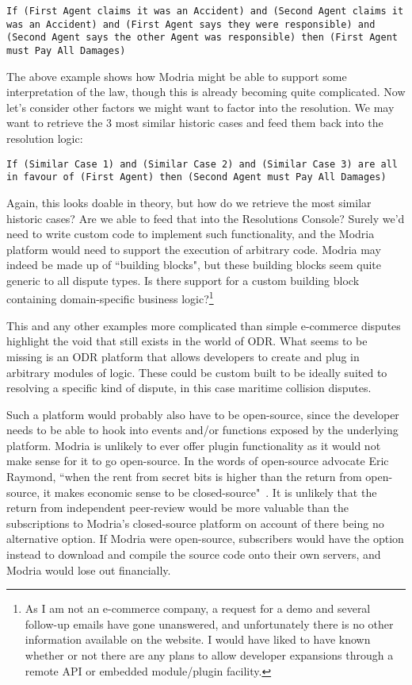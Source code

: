 \begin{lstlisting}
If (First Agent claims it was an Accident) and (Second Agent claims it was an Accident) and (First Agent says they were responsible) and (Second Agent says the other Agent was responsible) then (First Agent must Pay All Damages)
\end{lstlisting}

The above example shows how Modria might be able to support some interpretation of the law, though this is already becoming quite complicated. Now let's consider other factors we might want to factor into the resolution. We may want to retrieve the 3 most similar historic cases and feed them back into the resolution logic:

\begin{lstlisting}
If (Similar Case 1) and (Similar Case 2) and (Similar Case 3) are all in favour of (First Agent) then (Second Agent must Pay All Damages)
\end{lstlisting}

Again, this looks doable in theory, but how do we retrieve the most similar historic cases? Are we able to feed that into the Resolutions Console? Surely we'd need to write custom code to implement such functionality, and the Modria platform would need to support the execution of arbitrary code. Modria may indeed be made up of ``building blocks", but these building blocks seem quite generic to all dispute types. Is there support for a custom building block containing domain-specific business logic?\footnote{As I am not an e-commerce company, a request for a demo and several follow-up emails have gone unanswered, and unfortunately there is no other information available on the website. I would have liked to have known whether or not there are any plans to allow developer expansions through a remote API or embedded module/plugin facility.}

This and any other examples more complicated than simple e-commerce disputes highlight the void that still exists in the world of ODR. What seems to be missing is an ODR platform that allows developers to create and plug in arbitrary modules of logic. These could be custom built to be ideally suited to resolving a specific kind of dispute, in this case maritime collision disputes.

Such a platform would probably also have to be open-source, since the developer needs to be able to hook into events and/or functions exposed by the underlying platform. Modria is unlikely to ever offer plugin functionality as it would not make sense for it to go open-source. In the words of open-source advocate Eric Raymond, ``when the rent from secret bits is higher than the return from open-source, it makes economic sense to be closed-source"~\cite{eric:catB}. It is unlikely that the return from independent peer-review would be more valuable than the subscriptions to Modria's closed-source platform on account of there being no alternative option. If Modria were open-source, subscribers would have the option instead to download and compile the source code onto their own servers, and Modria would lose out financially.

